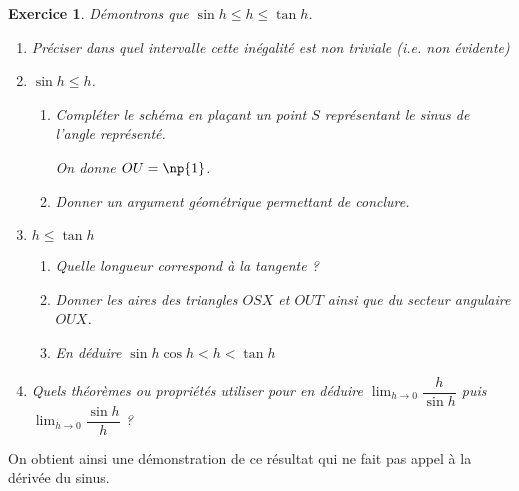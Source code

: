 \documentclass[11pt,a4paper,french]{article}
\theoremstyle{break}
\theoremstyle{plain}
\newtheorem{exerciceT}{Exercice}
\theoremstyle{nonumberplain}
\theoremstyle{nonumberbreak}
\newenvironment{exercice}{\begin{framed}\begin{exerciceT}}{\end{exerciceT}\end{framed}}
\begin{document}
\begin{exercice}
  Démontrons que $\sin h \leqslant h \leqslant \tan h$.

  \begin{enumerate}
    \item Préciser dans quel intervalle cette inégalité est non triviale
      (i.e. non évidente)
    \item $\sin h \leqslant h$.
      \begin{enumerate}
        \item Compléter le schéma en plaçant un point $S$ représentant
          le sinus de l'angle représenté.
          \begin{center}
          \end{center}
          On donne $OU = \np{1}$.
        \item Donner un argument géométrique permettant de conclure.
      \end{enumerate}
    \item $h \leqslant \tan h$
      \begin{enumerate}
        \item Quelle longueur correspond à la tangente ?
        \item Donner les aires des triangles $OSX$ et $OUT$ ainsi que du
          secteur angulaire $OUX$.
        \item En déduire $\sin h \cos h < h < \tan h$
      \end{enumerate}
    \item Quels théorèmes ou propriétés utiliser pour en déduire
      $\lim_{h\to 0} \dfrac{h}{\sin h}$ puis $\lim_{h\to 0} \dfrac{\sin
      h}h$ ?
  \end{enumerate}
\end{exercice}

On obtient ainsi une démonstration de ce résultat qui ne fait pas appel
à la dérivée du sinus.
\end{document}

